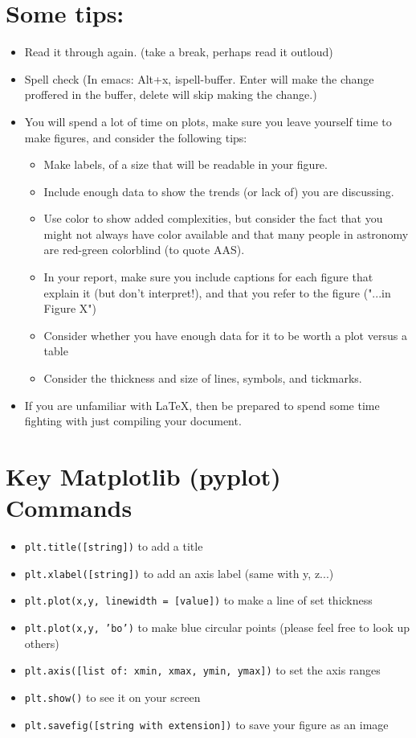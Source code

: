 \documentclass[12pt]{article}
\begin{document}
\section*{Some tips:}
\begin{itemize}
  \item{Read it through again. (take a break, perhaps read it outloud)}
  \item{Spell check (In emacs: Alt+x, ispell-buffer. Enter will make the change proffered in the buffer, delete will skip making the change.)}
  \item{You will spend a lot of time on plots, make sure you leave yourself time to make figures, and consider the following tips:}
    \begin{itemize}
      \item{Make labels, of a size that will be readable in your figure.}
      \item{Include enough data to show the trends (or lack of) you are discussing.}
      \item{Use color to show added complexities, but consider the fact that you might not always have color available and that many people in astronomy are red-green colorblind (to quote AAS).}
      \item{In your report, make sure you include captions for each figure that explain it (but don't interpret!), and that you refer to the figure ("...in Figure X")}
      \item{Consider whether you have enough data for it to be worth a plot versus a table}
      \item{Consider the thickness and size of lines, symbols, and tickmarks.}
    \end{itemize}
  \item{If you are unfamiliar with \LaTeX, then be prepared to spend some time fighting with just compiling your document.}
\end{itemize}

\section*{Key Matplotlib (pyplot) Commands}
\begin{itemize}
  \item{{\tt plt.title([string])} to add a title}
  \item{{\tt plt.xlabel([string])} to add an axis label (same with y, z...)}
  \item{{\tt plt.plot(x,y, linewidth = [value])} to make a line of set thickness}
  \item{{\tt plt.plot(x,y, 'bo')} to make blue circular points (please feel free to look up others)}
  \item{{\tt plt.axis([list of: xmin, xmax, ymin, ymax])} to set the axis ranges}
  \item{{\tt plt.show()} to see it on your screen}
  \item{{\tt plt.savefig([string with extension])} to save your figure as an image}
\end{itemize}
\end{document}
